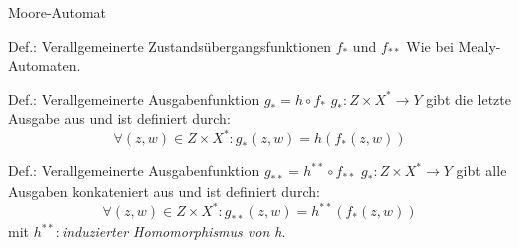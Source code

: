 \begin{frame}{Moore-Automat}
	\begin{block}{Def.: Verallgemeinerte Zustandsübergangsfunktionen $f_{\ast}$ und $f_{\ast\ast}$}
		Wie bei Mealy-Automaten.
	\end{block}

	\begin{block}{Def.: Verallgemeinerte Ausgabenfunktion $g_{\ast} = h \circ f_{\ast}$}
		$g_{\ast} : Z \times X^{\ast} \rightarrow Y$ gibt die letzte Ausgabe aus und ist definiert durch:
		\[
			\forall(z,w) \in Z \times X^{\ast} : g_{\ast}(z,w) = h(f_{\ast}(z,w))
		\]
	\end{block}

	\begin{block}{Def.: Verallgemeinerte Ausgabenfunktion $g_{\ast\ast} = h^{\ast\ast} \circ f_{\ast\ast}$}
		$g_{\ast} : Z \times X^{\ast} \rightarrow Y$ gibt alle Ausgaben konkateniert aus und ist definiert durch:
		\[
			\forall(z,w) \in Z \times X^{\ast} : g_{\ast\ast}(z,w) = h^{\ast\ast}(f_{\ast}(z,w))
		\]
		mit $h^{\ast\ast} :$\textit{induzierter Homomorphismus von h}.
	\end{block}
\end{frame}

